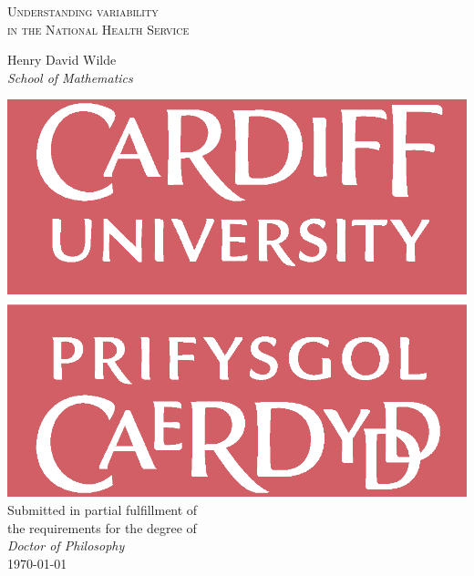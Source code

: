 \begin{titlepage}
    \begin{center}

    \huge%
    \vspace*{2em}
    
    \textsc{Understanding variability\\ in the National Health Service\\}

    \LARGE%
    \vspace{4em}
    Henry David Wilde\\
    \emph{School of Mathematics}\\[1ex]

    \vfill

    \includegraphics[width=.3\linewidth]{logo}\\[1ex]

    \vfill
    \Large%
    Submitted in partial fulfillment of\\
    the requirements for the degree of\\
    \emph{Doctor of Philosophy}\\[2em]

    \LARGE%
    \monthyeardate\today
    \end{center}
\end{titlepage}
